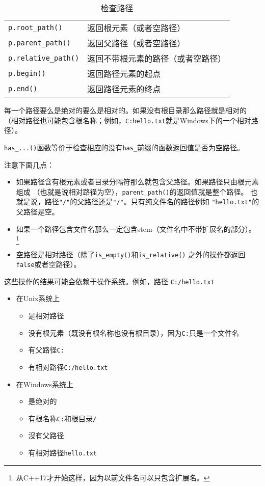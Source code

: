 \begin{table}[ht]
\begin{tabular}{l|l}
        \texttt{p.root\_path()}           & 返回根元素（或者空路径）                \\
        \texttt{p.parent\_path()}         & 返回父路径（或者空路径）                \\
        \texttt{p.relative\_path()}       & 返回不带根元素的路径（或者空路径）           \\
        \texttt{p.begin()}                & 返回路径元素的起点                   \\
        \texttt{p.end()}                  & 返回路径元素的终点                   \\
        \hline
    \end{tabular}
    \caption{检查路径}
    \label{t20.4}
\end{table}

每一个路径要么是绝对的要么是相对的。如果没有根目录那么路径就是相对的
（相对路径也可能包含根名称；例如，\texttt{C:hello.txt}就是Windows下的一个相对路径）。

\texttt{has\_...()}函数等价于检查相应的没有\texttt{has\_}前缀的函数返回值是否为空路径。

注意下面几点：
\begin{itemize}
    \item 如果路径含有根元素或者目录分隔符那么就包含父路径。如果路径只由根元素组成
    （也就是说相对路径为空），\texttt{parent\_path()}的返回值就是整个路径。
    也就是说，路径\texttt{"/"}的父路径还是\texttt{"/"}。只有纯文件名的路径例如
    \texttt{"hello.txt"}的父路径是空。
    \item 如果一个路径包含文件名那么一定包含stem（文件名中不带扩展名的部分）。
    \footnote{从C++17才开始这样，因为以前文件名可以只包含扩展名。}
    \item 空路径是相对路径（除了\texttt{is\_empty()}和\texttt{is\_relative()}
    之外的操作都返回\texttt{false}或者空路径）。
\end{itemize}
这些操作的结果可能会依赖于操作系统。例如，路径
\texttt{C:/hello.txt}
\begin{itemize}
    \item 在Unix系统上
    \begin{itemize}
        \item 是相对路径
        \item 没有根元素（既没有根名称也没有根目录），因为\texttt{C:}只是一个文件名
        \item 有父路径\texttt{C:}
        \item 有相对路径\texttt{C:/hello.txt}
    \end{itemize}
    \item 在Windows系统上
    \begin{itemize}
        \item 是绝对的
        \item 有根名称\texttt{C:}和根目录\texttt{/}
        \item 沒有父路径
        \item 有相对路径\texttt{hello.txt}
    \end{itemize}
\end{itemize}

